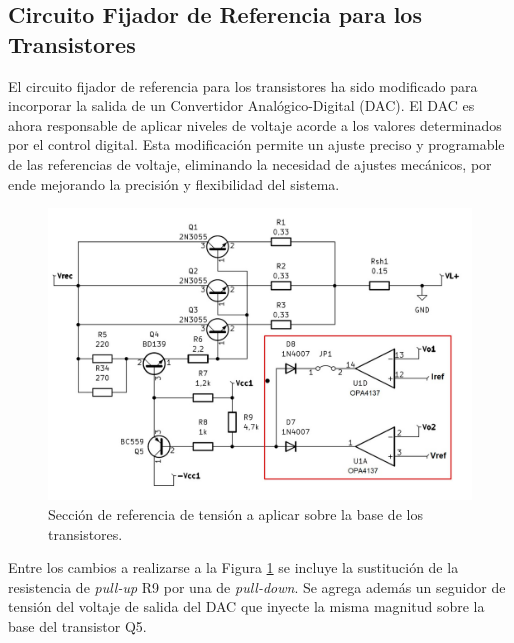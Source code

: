 \subsection{Circuito Fijador de Referencia para los Transistores}
El circuito fijador de referencia para los transistores ha sido modificado para incorporar la salida de un Convertidor Analógico-Digital (DAC). El DAC es ahora responsable de aplicar niveles de voltaje acorde a los valores determinados por el control digital. Esta modificación permite un ajuste preciso y programable de las referencias de voltaje, eliminando la necesidad de ajustes mecánicos, por ende mejorando la precisión y flexibilidad del sistema.
\begin{figure}[H]
    \centering
    \includegraphics[scale=0.3]{./imagenes/Eliminada1.jpg}
    \caption{Sección de referencia de tensión a aplicar sobre la base de los transistores.}
    \label{F:Eliminada1}
\end{figure}\par 
Entre los cambios a realizarse a la Figura \ref{F:Eliminada1} se incluye la sustitución de la resistencia de \textit{pull-up} R9 por una de \textit{pull-down}. Se agrega además un seguidor de tensión del voltaje de salida del DAC que inyecte la misma magnitud sobre la base del transistor Q5.

